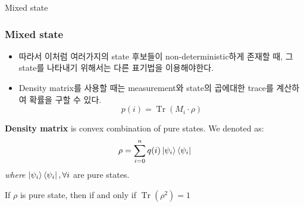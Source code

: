 \documentclass[9pt]{beamer}
\begin{document}
\begin{section}{Mixed state}
        \begin{frame}
            \frametitle{Mixed state}
            \begin{itemize}
                \item 따라서 이처럼 여러가지의 state 후보들이 non-deterministic하게 존재할 때, 그 state를 나타내기 위해서는 다른 표기법을 이용해야한다.
                \item Density matrix를 사용할 때는 measurement와 state의 곱에대한 trace를 계산하여 확률을 구할 수 있다.
                $$p(i) = \operatorname{Tr}(M_i \cdot \rho)$$
            \end{itemize}
            \begin{definition}
                \textbf{Density matrix} is convex combination of pure states. We denoted as:
                $$ \rho = \sum_{i=0}^n q(i) \ket{\psi_i} \bra{\psi_i}$$
                \textit{where} $\ket{\psi_i} \bra{\psi_i}, \forall i$ are pure states.
            \end{definition}
            \begin{theorem}
                If $\rho$ is pure state, then if and only if $\operatorname{Tr}(\rho^2) = 1$
            \end{theorem}
        \end{frame}
    \end{section}
\end{document}

